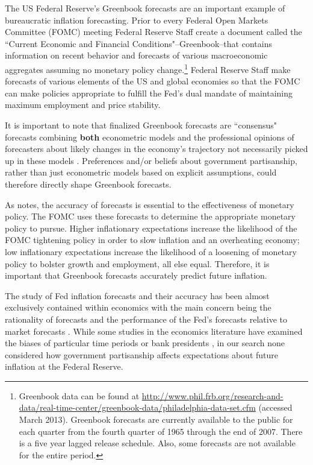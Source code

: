 \documentclass[a4paper]{article}\usepackage{graphicx, color}
\begin{document}
The US Federal Reserve's Greenbook forecasts are an important example of bureaucratic inflation forecasting. Prior to every Federal Open Markets Committee (FOMC) meeting Federal Reserve Staff create a document called the ``Current Economic and Financial Conditions"--Greenbook--that contains information on recent behavior and forecasts of various macroeconomic aggregates assuming no monetary policy change.\footnote{Greenbook data can be found at {\url{http://www.phil.frb.org/research-and-data/real-time-center/greenbook-data/philadelphia-data-set.cfm}} (accessed March 2013). Greenbook forecasts are currently available to the public for each quarter from the fourth quarter of 1965 through the end of 2007. There is a five year lagged release schedule. Also, some forecasts are not available for the entire period.} Federal Reserve Staff make forecasts of various elements of the US and global economies so that the FOMC can make policies appropriate to fulfill the Fed's dual mandate of maintaining maximum employment and price stability.

It is important to note that finalized Greenbook forecasts are ``consensus" forecasts combining \textbf{both} econometric models and the professional opinions of forecasters about likely changes in the economy's trajectory not necessarily picked up in these models \citep{Karamouzis1989,Reifschneider1997}. Preferences and/or beliefs about government partisanship, rather than just econometric models based on explicit assumptions, could therefore directly shape Greenbook forecasts. 

As \cite{Svensson2005} notes, the accuracy of forecasts is essential to the effectiveness of monetary policy. The FOMC uses these forecasts to determine the appropriate monetary policy to pursue. Higher inflationary expectations increase the likelihood of the FOMC tightening policy in order to slow inflation and an overheating economy; low inflationary expectations increase the likelihood of a loosening of monetary policy to bolster growth and employment, all else equal. Therefore, it is important that Greenbook forecasts accurately predict future inflation.

The study of Fed inflation forecasts and their accuracy has been almost exclusively contained within economics with the main concern being the rationality of forecasts \cite[e.g.][]{Capistran2006, Romer2000} and the performance of the Fed's forecasts relative to market forecasts \cite[e.g.][]{Faust2007, Gamber2009}. While some studies in the economics literature have examined the biases of particular time periods \cite[e.g.][]{Capistran2006} or bank presidents \cite[e.g.][]{Havrilesky1995}, in our search none considered how government partisanship affects expectations about future inflation at the Federal Reserve.
 
\end{document}
